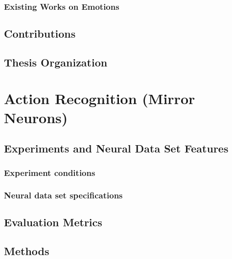 \documentclass[a4,12pt]{ozu-thesis}
\begin{document}
\subsection{Existing Works on Emotions}


\newpage
\section{Contributions}



\section{Thesis Organization}


\chapter{Action Recognition (Mirror Neurons)}
 
 

\newpage
\section{Experiments and Neural Data Set Features}




\subsection{Experiment conditions}


\subsection{Neural data set specifications}


\section{Evaluation Metrics}



\section{Methods}
\end{document}
